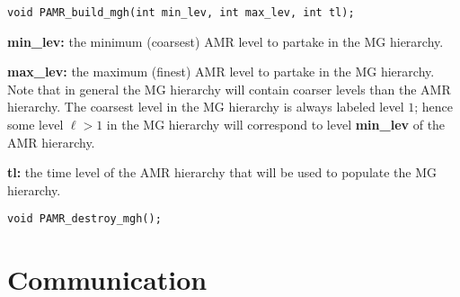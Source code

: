 \documentclass[aps,amssymb,unsortedaddress,nofootinbib]{revtex4}
\def\lsep{\itemsep 0.05in}
\begin{document}

\begin{verbatim}
void PAMR_build_mgh(int min_lev, int max_lev, int tl);
\end{verbatim}
\begin{list}{}{\lsep}
\item {\bf min\_lev:} the minimum (coarsest) AMR level to partake in the MG hierarchy.
\item {\bf max\_lev:} the maximum (finest) AMR level to partake in the MG hierarchy.
                      Note that in general the MG hierarchy will contain coarser levels
                      than the AMR hierarchy. The coarsest level in the MG hierarchy
                      is always labeled level $1$; hence some level $\ell>1$ in the MG
                      hierarchy will correspond to level {\bf min\_lev} of the AMR
                      hierarchy.
\item {\bf tl:} the time level of the AMR hierarchy that will be used to populate the MG 
                hierarchy.
\end{list}


\begin{verbatim}
void PAMR_destroy_mgh();
\end{verbatim}


\section{Communication}
\end{document}
